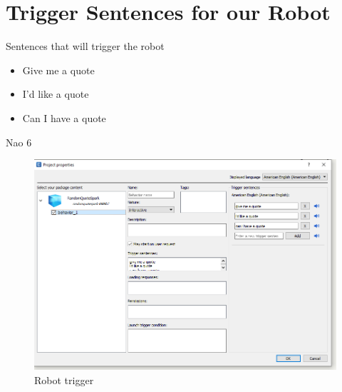 \section{Trigger Sentences for our Robot}
    
    \frame{\sectionpage}
    
    \begin{frame}{Sentences that will trigger the robot}
		\begin{itemize}
			\item Give me a quote
			\pause
			\item I'd like a quote
			\pause
			\item Can I have a quote
		\end{itemize}
	\end{frame}
	\begin{frame}{Nao 6}
		\begin{figure}
			\centering
			\includegraphics[width =0.7\linewidth]{robot-spark-proj/screenshot-3.PNG}
			\caption{Robot trigger}
		\end{figure}

	\end{frame}